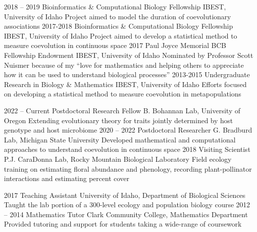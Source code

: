 \documentclass[9pt]{developercv} %
\begin{document}
\vspace{-10 pt}
\begin{entrylist}
    \entry
        {2018 -- 2019}
        {Bioinformatics \& Computational Biology Fellowship}
        {IBEST, University of Idaho}
        {Project aimed to model the duration of coevolutionary associations}
    \entry
        {2017-2018}
        {Bioinformatics \& Computational Biology Fellowship}
        {IBEST, University of Idaho}
        {Project aimed to develop a statistical method to measure coevolution in continuous space}
    \entry
        {2017}
        {Paul Joyce Memorial BCB Fellowship Endowment}
        {IBEST, University of Idaho}
        {Nominated by Professor Scott Nuismer because of my “love for mathematics and helping others to appreciate how it can be used to understand biological processes”}
    \entry
        {2013-2015}
        {Undergraduate Research in Biology \& Mathematics}
        {IBEST, University of Idaho}
        {Efforts focused on developing a statistical method to measure coevolution in metapopulations}
\end{entrylist}

\vspace{-5 pt}
\begin{entrylist}
	\entry
        {2022 -- Current}
		{Postdoctoral Research Fellow}
		{B. Bohannan Lab, University of Oregon}
		{Extending evolutionary theory for traits jointly determined by host genotype and host microbiome}
        \entry
        {2020 -- 2022}
		{Postdoctoral Researcher}
		{G. Bradburd Lab, Michigan State University}
		{Developed mathematical and computational approaches to understand coevolution in continuous space}
        \entry
        {2018}
		{Visiting Scientist}
		{P.J. CaraDonna Lab, Rocky Mountain Biological Laboratory}
		{Field ecology training on estimating floral abundance and phenology, recording plant-pollinator interactions and estimating percent cover}
\end{entrylist}

\vspace{-5 pt}
\begin{entrylist}
	\entry
        {2017}
		{Teaching Assistant}
		{University of Idaho, Department of Biological Sciences}
        {Taught the lab portion of a 300-level ecology and population biology course}
        \entry
        {2012 -- 2014}
		{Mathematics Tutor}
		{Clark Community College, Mathematics Department}
        {Provided tutoring and support for students taking a wide-range of coursework}
\end{entrylist}
\end{document}
